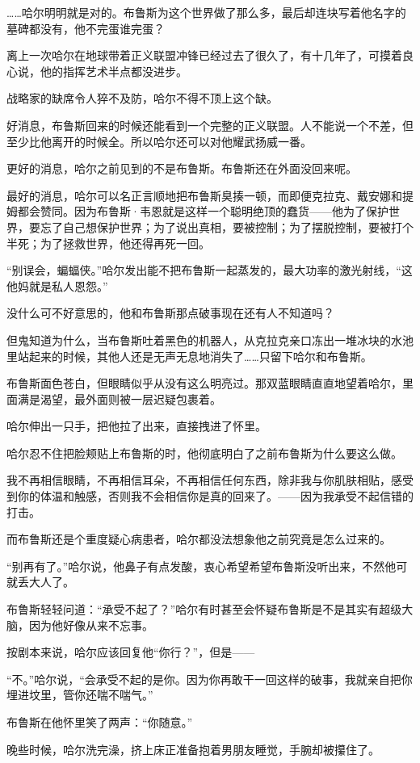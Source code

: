 \documentclass[../main]{subfiles}
\begin{document}
……哈尔明明就是对的。布鲁斯为这个世界做了那么多，最后却连块写着他名字的墓碑都没有，他不完蛋谁完蛋？

离上一次哈尔在地球带着正义联盟冲锋已经过去了很久了，有十几年了，可摸着良心说，他的指挥艺术半点都没进步。

战略家的缺席令人猝不及防，哈尔不得不顶上这个缺。

好消息，布鲁斯回来的时候还能看到一个完整的正义联盟。人不能说一个不差，但至少比他离开的时候全。所以哈尔还可以对他耀武扬威一番。

更好的消息，哈尔之前见到的不是布鲁斯。布鲁斯还在外面没回来呢。

最好的消息，哈尔可以名正言顺地把布鲁斯臭揍一顿，而即便克拉克、戴安娜和提姆都会赞同。因为布鲁斯·韦恩就是这样一个聪明绝顶的蠢货——他为了保护世界，要忘了自己想保护世界；为了说出真相，要被控制；为了摆脱控制，要被打个半死；为了拯救世界，他还得再死一回。

“别误会，蝙蝠侠。”哈尔发出能不把布鲁斯一起蒸发的，最大功率的激光射线，“这他妈就是私人恩怨。”

没什么可不好意思的，他和布鲁斯那点破事现在还有人不知道吗？

但鬼知道为什么，当布鲁斯吐着黑色的机器人，从克拉克亲口冻出一堆冰块的水池里站起来的时候，其他人还是无声无息地消失了……只留下哈尔和布鲁斯。

布鲁斯面色苍白，但眼睛似乎从没有这么明亮过。那双蓝眼睛直直地望着哈尔，里面满是渴望，最外面则被一层迟疑包裹着。

哈尔伸出一只手，把他拉了出来，直接拽进了怀里。

哈尔忍不住把脸颊贴上布鲁斯的时，他彻底明白了之前布鲁斯为什么要这么做。

我不再相信眼睛，不再相信耳朵，不再相信任何东西，除非我与你肌肤相贴，感受到你的体温和触感，否则我不会相信你是真的回来了。——因为我承受不起信错的打击。

而布鲁斯还是个重度疑心病患者，哈尔都没法想象他之前究竟是怎么过来的。

“别再有了。”哈尔说，他鼻子有点发酸，衷心希望希望布鲁斯没听出来，不然他可就丢大人了。

布鲁斯轻轻问道：“承受不起了？”哈尔有时甚至会怀疑布鲁斯是不是其实有超级大脑，因为他好像从来不忘事。

按剧本来说，哈尔应该回复他“你行？”，但是——

“不。”哈尔说，“会承受不起的是你。因为你再敢干一回这样的破事，我就亲自把你埋进坟里，管你还喘不喘气。”

布鲁斯在他怀里笑了两声：“你随意。”

晚些时候，哈尔洗完澡，挤上床正准备抱着男朋友睡觉，手腕却被攥住了。
\end{document}

